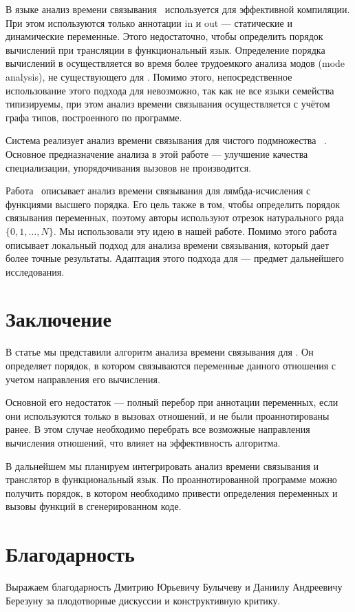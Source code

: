 \documentclass[conference,american,russian]{IEEEtran}
\begin{document}
В языке \mercury{} анализ времени связывания~\cite{vanhoof2004binding} используется для эффективной компиляции. 
При этом используются только аннотации in и out --- статические и динамические переменные. 
Этого недостаточно, чтобы определить порядок вычислений при трансляции в функциональный язык.
Определение порядка вычислений в \mercury{} осуществляется во время более трудоемкого анализа модов (mode analysis), не существующего для \miniKanren{}. 
Помимо этого, непосредственное использование этого подхода для \miniKanren{} невозможно, так как не все языки семейства типизируемы, при этом анализ времени связывания \mercury{} осуществляется с учётом графа типов, построенного по программе. 

Система \logen{} реализует анализ времени связывания для чистого подмножества \prolog{}~\cite{leuschel2004prolog}.
Основное предназначение анализа в этой работе --- улучшение качества специализации, упорядочивания вызовов не производится. 

Работа~\cite{Thiemann1997AUF} описывает анализ времени связывания для лямбда-исчисления с функциями высшего порядка. 
Его цель также в том, чтобы определить порядок связывания переменных, поэтому авторы используют отрезок натурального ряда $\{ 0, 1, \dots, N\}$. 
Мы использовали эту идею в нашей работе. 
Помимо этого работа~\cite{Thiemann1997AUF} описывает локальный подход для анализа времени связывания, который дает более точные результаты. 
Адаптация этого подхода для \miniKanren{} --- предмет дальнейшего исследования. 

\section{Заключение}\label{conclusion}

В статье мы представили алгоритм анализа времени связывания для \miniKanren{}. 
Он определяет порядок, в котором связываются переменные данного отношения с учетом направления его вычисления.  

Основной его недостаток --- полный перебор при аннотации переменных, если они используются только в вызовах отношений, и не были проаннотированы ранее. 
В этом случае необходимо перебрать все возможные направления вычисления отношений, что влияет на эффективность алгоритма.

В дальнейшем мы планируем интегрировать анализ времени связывания и транслятор в функциональный язык. 
По проаннотированной программе можно получить порядок, в котором необходимо привести определения переменных и вызовы функций в сгенерированном коде.

\section*{Благодарность}

Выражаем благодарность Дмитрию Юрьевичу Булычеву и Даниилу Андреевичу Березуну за плодотворные дискуссии и конструктивную критику.



\end{document}
